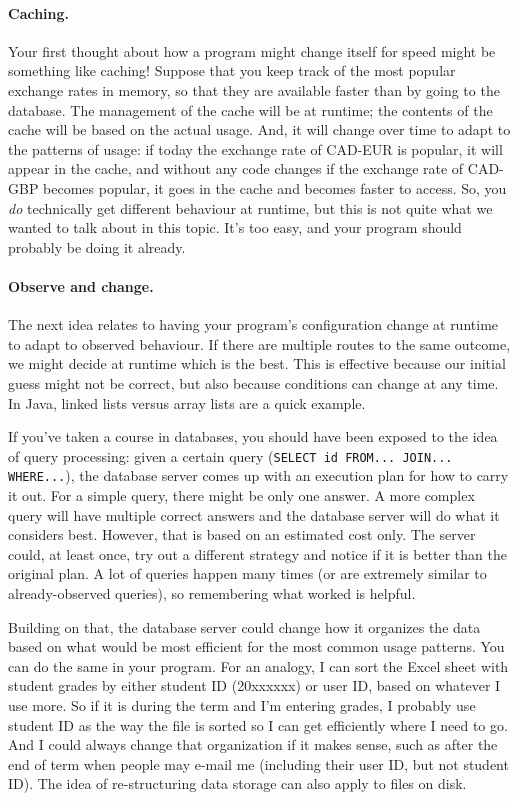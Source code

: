 \documentclass[a4paper]{report}
\begin{document}
\paragraph{Caching.} Your first thought about how a program might change itself for speed might be something like caching! Suppose that you keep track of the most popular exchange rates in memory, so that they are available faster than by going to the database. The management of the cache will be at runtime; the contents of the cache will be based on the actual usage. And, it will change over time to adapt to the patterns of usage: if today the exchange rate of CAD-EUR is popular, it will appear in the cache, and without any code changes if the exchange rate of CAD-GBP becomes popular, it goes in the cache and becomes faster to access. So, you \textit{do} technically get different behaviour at runtime, but this is not quite what we wanted to talk about in this topic. It's too easy, and your program should probably be doing it already.

\paragraph{Observe and change.}
The next idea relates to having your program's configuration change at runtime to adapt to observed behaviour. If there are multiple routes to the same outcome, we might decide at runtime which is the best. This is effective because our initial guess might not be correct, but also because conditions can change at any time. In Java, linked lists versus array lists are a quick example.

If you've taken a course in databases, you should have been exposed to the idea of query processing: given a certain query (\texttt{SELECT id FROM... JOIN... WHERE...}), the database server comes up with an execution plan for how to carry it out. For a simple query, there might be only one answer. A more complex query will have multiple correct answers and the database server will do what it considers best. However, that is based on an estimated cost only. The server could, at least once, try out a different strategy and notice if it is better than the original plan. A lot of queries happen many times (or are extremely similar to already-observed queries), so remembering what worked is helpful.

Building on that, the database server could change how it organizes the data based on what would be most efficient for the most common usage patterns. You can do the same in your program. For an analogy, I can sort the Excel sheet with student grades by either student ID (20xxxxxx) or user ID, based on whatever I use more. So if it is during the term and I'm entering grades, I probably use student ID as the way the file is sorted so I can get efficiently where I need to go. And I could always change that organization if it makes sense, such as after the end of term when people may e-mail me (including their user ID, but not student ID). The idea of re-structuring data storage can also apply to files on disk.
\end{document}
